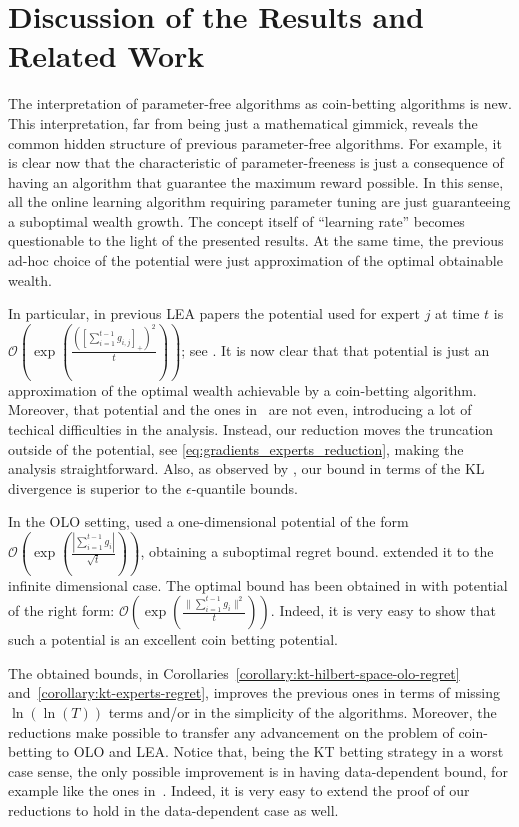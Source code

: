 \section{Discussion of the Results and Related Work}
\label{sec:discussion}

The interpretation of parameter-free algorithms as coin-betting algorithms is
new. This interpretation, far from being just a mathematical gimmick, reveals
the common hidden structure of previous parameter-free algorithms. For example,
it is clear now that the characteristic of parameter-freeness is just a
consequence of having an algorithm that guarantee the maximum reward possible.
In this sense, all the online learning algorithm requiring parameter tuning are
just guaranteeing a suboptimal wealth growth. The concept itself of ``learning rate'' becomes questionable to the light of the presented results.
At the same time, the previous
ad-hoc choice of the potential were just approximation of the optimal obtainable
wealth.

In particular, in previous \ac{LEA} papers the potential used for expert $j$ at
time $t$ is $\mathcal{O}\left(\exp \left(\frac{([\sum_{i=1}^{t-1} g_{i,j}]_+)^2}{t}
\right) \right)$; see \citep{ChaudhuriYH09,LuoE14,LuoS15}. It is now clear that
that potential is just an approximation of the optimal wealth achievable by a
coin-betting algorithm. Moreover, that potential and the ones
in~\citet{ChernovV10,KoolenE15} are not even, introducing a lot of techical
difficulties in the analysis. Instead, our reduction moves the truncation
outside of the potential, see \eqref{eq:gradients_experts_reduction}, making the
analysis straightforward. Also, as observed by \citet{ChernovV10}, our bound in
terms of the KL divergence is superior to the $\epsilon$-quantile bounds.

In the \ac{OLO} setting, \citet{StreeterM12} used a one-dimensional potential of
the form $\mathcal{O}\left(\exp \left(\frac{|\sum_{i=1}^{t-1}
g_{i}|}{\sqrt{t}}\right)\right)$, obtaining a suboptimal regret bound.
\citet{Orabona13} extended it to the infinite dimensional case. The optimal
bound has been obtained in \citet{McMahanO14} with potential of the right form:
$\mathcal{O}\left(\exp \left(\frac{\|\sum_{i=1}^{t-1}
g_{i}\|^2}{t}\right)\right)$. Indeed, it is very easy to show that such a
potential is an excellent coin betting potential.

The obtained bounds, in Corollaries~\ref{corollary:kt-hilbert-space-olo-regret}
and~\ref{corollary:kt-experts-regret}, improves the previous ones in terms of
missing $\ln(\ln(T))$ terms and/or in the simplicity of the algorithms. Moreover, the
reductions make possible to transfer any advancement on the problem of
coin-betting to \ac{OLO} and \ac{LEA}. Notice that, being the \ac{KT} betting
strategy in a worst case sense, the only possible improvement is in having
data-dependent bound, for example like the ones in~\cite{KoolenE15}. Indeed, it
is very easy to extend the proof of our reductions to hold in the data-dependent
case as well.

